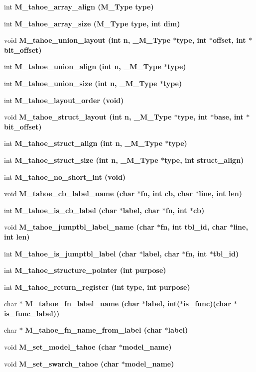 \begin{CompactItemize}
\item 
int \bf{M\_\-tahoe\_\-array\_\-align} (\bf{M\_\-Type} type)
\item 
int \bf{M\_\-tahoe\_\-array\_\-size} (\bf{M\_\-Type} type, int dim)
\item 
void \bf{M\_\-tahoe\_\-union\_\-layout} (int n, \bf{\_\-M\_\-Type} $\ast$type, int $\ast$offset, int $\ast$bit\_\-offset)
\item 
int \bf{M\_\-tahoe\_\-union\_\-align} (int n, \bf{\_\-M\_\-Type} $\ast$type)
\item 
int \bf{M\_\-tahoe\_\-union\_\-size} (int n, \bf{\_\-M\_\-Type} $\ast$type)
\item 
int \bf{M\_\-tahoe\_\-layout\_\-order} (void)
\item 
void \bf{M\_\-tahoe\_\-struct\_\-layout} (int n, \bf{\_\-M\_\-Type} $\ast$type, int $\ast$base, int $\ast$bit\_\-offset)
\item 
int \bf{M\_\-tahoe\_\-struct\_\-align} (int n, \bf{\_\-M\_\-Type} $\ast$type)
\item 
int \bf{M\_\-tahoe\_\-struct\_\-size} (int n, \bf{\_\-M\_\-Type} $\ast$type, int struct\_\-align)
\item 
int \bf{M\_\-tahoe\_\-no\_\-short\_\-int} (void)
\item 
void \bf{M\_\-tahoe\_\-cb\_\-label\_\-name} (char $\ast$fn, int cb, char $\ast$line, int len)
\item 
int \bf{M\_\-tahoe\_\-is\_\-cb\_\-label} (char $\ast$label, char $\ast$fn, int $\ast$cb)
\item 
void \bf{M\_\-tahoe\_\-jumptbl\_\-label\_\-name} (char $\ast$fn, int tbl\_\-id, char $\ast$line, int len)
\item 
int \bf{M\_\-tahoe\_\-is\_\-jumptbl\_\-label} (char $\ast$label, char $\ast$fn, int $\ast$tbl\_\-id)
\item 
int \bf{M\_\-tahoe\_\-structure\_\-pointer} (int purpose)
\item 
int \bf{M\_\-tahoe\_\-return\_\-register} (int type, int purpose)
\item 
char $\ast$ \bf{M\_\-tahoe\_\-fn\_\-label\_\-name} (char $\ast$label, int($\ast$is\_\-func)(char $\ast$is\_\-func\_\-label))
\item 
char $\ast$ \bf{M\_\-tahoe\_\-fn\_\-name\_\-from\_\-label} (char $\ast$label)
\item 
void \bf{M\_\-set\_\-model\_\-tahoe} (char $\ast$model\_\-name)
\item 
void \bf{M\_\-set\_\-swarch\_\-tahoe} (char $\ast$model\_\-name)
\item 

\end{CompactItemize}
